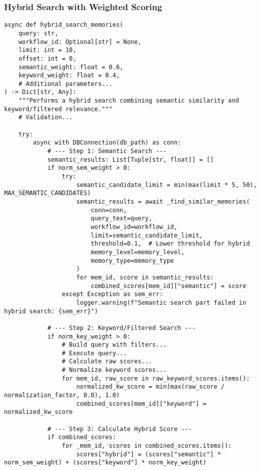 \documentclass[12pt,a4paper]{article}
\begin{document}
\subsubsection*{Hybrid Search with Weighted Scoring}
\begin{pageablecode}
\begin{verbatim}
async def hybrid_search_memories(
    query: str,
    workflow_id: Optional[str] = None,
    limit: int = 10,
    offset: int = 0,
    semantic_weight: float = 0.6,
    keyword_weight: float = 0.4,
    # Additional parameters...
) -> Dict[str, Any]:
    """Performs a hybrid search combining semantic similarity and keyword/filtered relevance."""
    # Validation...

    try:
        async with DBConnection(db_path) as conn:
            # --- Step 1: Semantic Search ---
            semantic_results: List[Tuple[str, float]] = []
            if norm_sem_weight > 0:
                try:
                    semantic_candidate_limit = min(max(limit * 5, 50), MAX_SEMANTIC_CANDIDATES)
                    semantic_results = await _find_similar_memories(
                        conn=conn,
                        query_text=query,
                        workflow_id=workflow_id,
                        limit=semantic_candidate_limit,
                        threshold=0.1,  # Lower threshold for hybrid
                        memory_level=memory_level,
                        memory_type=memory_type
                    )
                    for mem_id, score in semantic_results:
                        combined_scores[mem_id]["semantic"] = score
                except Exception as sem_err:
                    logger.warning(f"Semantic search part failed in hybrid search: {sem_err}")

            # --- Step 2: Keyword/Filtered Search ---
            if norm_key_weight > 0:
                # Build query with filters...
                # Execute query...
                # Calculate raw scores...
                # Normalize keyword scores...
                for mem_id, raw_score in raw_keyword_scores.items():
                    normalized_kw_score = min(max(raw_score / normalization_factor, 0.0), 1.0)
                    combined_scores[mem_id]["keyword"] = normalized_kw_score

            # --- Step 3: Calculate Hybrid Score ---
            if combined_scores:
                for _mem_id, scores in combined_scores.items():
                    scores["hybrid"] = (scores["semantic"] * norm_sem_weight) + (scores["keyword"] * norm_key_weight)


\end{verbatim}
\end{pageablecode}
\end{document}
